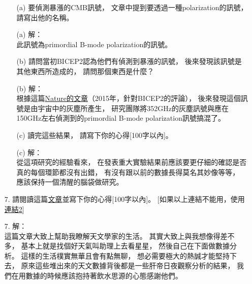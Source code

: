 \documentclass{article}
\theoremstyle{definition}
\begin{document}
\begin{enumerate}
\begin{enumerate}
			\item[(a)] 要偵測暴漲的CMB訊號，
				文章中提到要透過一種polarization的訊號，
				請寫出他的名稱。

			\item[(a)] 解：\\
				此訊號為primordial B-mode polarization的訊號。

			\item[(b)] 請問當初BICEP2認為他們有偵測到暴漲的訊號，
				後來發現該訊號是其他東西所造成的，
				請問那個東西是什麼？

			\item[(b)] 解：\\
				根據這篇\href{https://www.nature.com/articles/nature.2015.16830}{Nature的文章}（2015年，針對BICEP2的評論），
				後來發現這個訊號是由宇宙中的灰塵所產生，
				研究團隊將352GHz的灰塵訊號與應在150GHz左右偵測到的primordial B-mode polarization訊號搞混了。

			\item[(c)] 讀完這些結果，
				請寫下你的心得[100字以內]。

			\item[(c)] 解：\\
				從這項研究的經驗看來，
				在發表重大實驗結果前應該要更仔細的確認是否真的每個環節都沒有出錯，
				有沒有跟以前的數據長得莫名其妙像等等，
				應該保持一個清醒的腦袋做研究。

		\end{enumerate}

	\item[7.] 請閱讀這篇\href{https://calteches.library.caltech.edu/638/2/Men.pdf}{文章}並寫下你的心得[100字以內]。
		[如果以上連結不能用，使用\href{https://www.dropbox.com/s/yggx7xfldi5fefj/prime_focus_cage_men.pdf}{連結2}]

	\item[7.] 解：\\
		這篇文章大致上幫助我瞭解天文學家的生活。
		其實大致上與我想像得差不多，
		基本上就是找個好天氣叫助理上去看星星，
		然後自己在下面做數據分析。
		這樣的生活樸實無華且會有點無聊，
		想必需要極大的熱誠才能堅持下去，
		原來這些堆出來的天文數據背後都是一些肝帝日夜觀察分析的結果，
		我們在用數據的時候應該抱持著飲水思源的心態感謝他們。


\end{enumerate}
\end{document}
